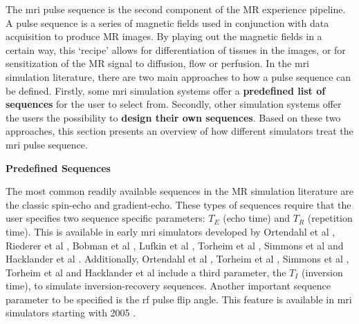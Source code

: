 The \ac{mri} pulse sequence is the second component of the MR experience pipeline.
A pulse sequence is a series of magnetic fields used in conjunction with data acquisition to produce MR images. 
By playing out the magnetic fields in a certain way, this `recipe' allows for differentiation of tissues in the images, or for sensitization of the MR signal to diffusion, flow or perfusion.
In the \ac{mri} simulation literature, there are two main approaches to how a pulse sequence can be defined.
Firstly, some \ac{mri} simulation systems offer a \textbf{predefined list of sequences} for the user to select from.
Secondly, other simulation systems offer the users the possibility to \textbf{design their own sequences}.
Based on these two approaches, this section presents an overview of how different simulators treat the \ac{mri} pulse sequence.

\hfill

\large \textbf{Predefined Sequences} \normalsize

The most common readily available sequences in the MR simulation literature are the classic spin-echo and gradient-echo.
These types of sequences require that the user specifies two sequence specific parameters: $T_E$ (echo time) and $T_R$ (repetition time).
This is available in early \ac{mri} simulators developed by Ortendahl et al \cite{Ortendahl1984}, Riederer et al \cite{Riederer1984}, Bobman et al \cite{Bobman1985}, Lufkin et al \cite{Lufkin1986}, Torheim et al \cite{Torheim1994}, Simmons et al \cite{Simmons1996} and Hacklander et al \cite{Hacklander2005}.
Additionally, Ortendahl et al \cite{Ortendahl1984}, Torheim et al \cite{Torheim1994}, Simmons et al \cite{Simmons1996}, Torheim et al \cite{Torheim1994} and Hacklander et al \cite{Hacklander2005} include a third parameter, the $T_I$ (inversion time), to simulate inversion-recovery sequences.
Another important sequence parameter to be specified is the \ac{rf} pulse flip angle. 
This feature is available in \ac{mri} simulators starting with 2005 \cite{Benoit-Cattin2005}.

